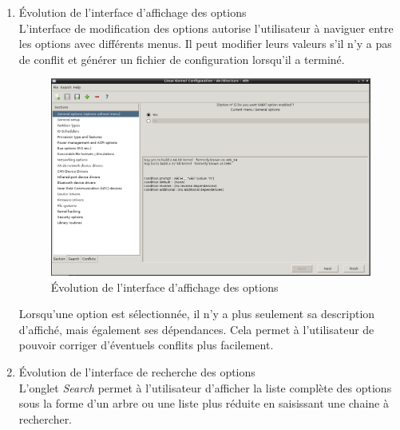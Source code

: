 \documentclass[17pts]{report}
\begin{document}
\begin{enumerate}
    \pagebreak
    \item Évolution de l'interface d'affichage des options \\

    L'interface de modification des options autorise l'utilisateur à naviguer
    entre les options avec différents menus. Il peut modifier leurs valeurs
    s'il n'y a pas de conflit et générer un fichier de configuration lorsqu'il
    a terminé.

    \begin{figure}[H]
        \includegraphics[scale=0.5]{./illustrations/screen_options_interface.png}
        \centering
        \caption{Évolution de l'interface d'affichage des options}
        \label{fig:Evo_config}
    \end{figure}

    Lorsqu'une option est sélectionnée, il n'y a plus seulement sa description
    d'affiché, mais également ses dépendances. Cela permet à l'utilisateur de
    pouvoir corriger d'éventuels conflits plus facilement.

    \pagebreak

    \item Évolution de l'interface de recherche des options \\

    L'onglet \textit{Search} permet à l'utilisateur d'afficher la liste
    complète des options sous la forme d'un arbre ou une liste plus réduite en
    saisissant une chaine à rechercher.


\end{enumerate}
\end{document}

